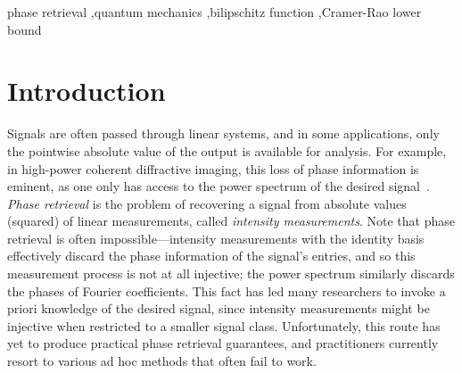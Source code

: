 \documentclass[times,10pt]{elsarticle}
\theoremstyle{plain}
\begin{document}
\begin{keyword}
phase retrieval \sep quantum mechanics \sep bilipschitz function \sep Cramer-Rao lower bound 
\end{keyword}

\maketitle

\section{Introduction}

Signals are often passed through linear systems, and in some applications, only the pointwise absolute value of the output is available for analysis.
For example, in high-power coherent diffractive imaging, this loss of phase information is eminent, as one only has access to the power spectrum of the desired signal~\cite{BunkDPDSSV:07}.
\textit{Phase retrieval} is the problem of recovering a signal from absolute values (squared) of linear measurements, called \textit{intensity measurements}.
Note that phase retrieval is often impossible---intensity measurements with the identity basis effectively discard the phase information of the signal's entries, and so this measurement process is not at all injective; the power spectrum similarly discards the phases of Fourier coefficients.
This fact has led many researchers to invoke a priori knowledge of the desired signal, since intensity measurements might be injective when restricted to a smaller signal class.
Unfortunately, this route has yet to produce practical phase retrieval guarantees, and practitioners currently resort to various ad hoc methods that often fail to work.
\end{document}
